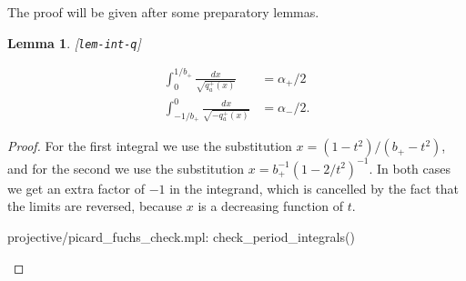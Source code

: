 \documentclass[reqno]{amsart}
\newcommand{\lbl}[1]{\label{#1}\textup{[\texttt{#1}]}\par}
\newcommand{\lbl}{\label}
\newcommand{\al}        {\alpha}
\renewcommand{\:}{\colon}
\newtheorem{lemma}[theorem]{Lemma}
\theoremstyle{definition}
\begin{document}
The proof will be given after some preparatory lemmas.

\begin{lemma}\lbl{lem-int-q}
 \begin{align*}
  \int_0^{1/b_+}  \frac{dx}{\sqrt{ q_a^+(x)}} &= \al_+/2 \\
  \int_{-1/b_+}^0 \frac{dx}{\sqrt{-q_a^+(x)}} &= \al_-/2.
 \end{align*}
\end{lemma}
\begin{proof}
 For the first integral we use the substitution
 $x=(1-t^2)/(b_+-t^2)$, and for the second we use the
 substitution $x=b_+^{-1}(1-2/t^2)^{-1}$.  In both cases we get an
 extra factor of $-1$ in the integrand, which is cancelled by the fact
 that the limits are reversed, because $x$ is a decreasing function of
 $t$.
 \begin{checks}
  projective/picard_fuchs_check.mpl: check_period_integrals()
 \end{checks}
\end{proof}
\end{document}
